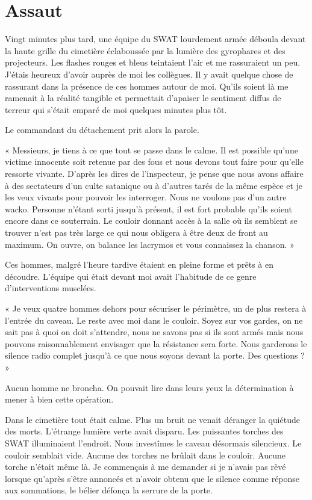 \chapter[Assaut]{Assaut}
Vingt minutes plus tard, une équipe du SWAT lourdement armée déboula devant la haute grille du cimetière éclaboussée 
par la lumière des gyrophares et des projecteurs. Les flashes rouges et bleus teintaient l'air et me rassuraient un peu. 
J'étais heureux d'avoir auprès de moi les collègues. Il y avait quelque chose de rassurant dans la présence de ces hommes 
autour de moi. Qu'ils soient là me ramenait à la réalité tangible et permettait d'apaiser le sentiment diffus de terreur 
qui s'était emparé de moi quelques minutes plus tôt.

Le commandant du détachement prit alors la parole.

« Messieurs, je tiens à ce que tout se passe dans le calme. Il est possible qu'une victime innocente soit retenue par 
des fous et nous devons tout faire pour qu'elle ressorte vivante. D'après les dires de l'inspecteur, je pense que nous 
avons affaire à des sectateurs d'un culte satanique ou à d'autres tarés de la même espèce et je les veux vivants pour 
pouvoir les interroger. Nous ne voulons pas d'un autre wacko. Personne n'étant sorti jusqu'à présent, il est fort 
probable qu'ils soient encore dans ce souterrain. Le couloir donnant accès à la salle où ils semblent se trouver n'est 
pas très large ce qui nous obligera à être deux de front au maximum. On ouvre, on balance les lacrymos et vous connaissez 
la chanson. »  

Ces hommes, malgré l'heure tardive étaient en pleine forme et prêts à en découdre. L'équipe qui était devant moi avait 
l'habitude de ce genre d'interventions musclées.

« Je veux quatre hommes dehors pour sécuriser le périmètre, un de plus restera à l'entrée du caveau. Le reste avec moi 
dans le couloir. Soyez sur vos gardes, on ne sait pas à quoi on doit s'attendre, nous ne savons pas si ils sont armés 
mais nous pouvons raisonnablement envisager que la résistance sera forte. Nous garderons le silence radio complet 
jusqu'à ce que nous soyons devant la porte. Des questions ? »

Aucun homme ne broncha. On pouvait lire dans leurs yeux la détermination à mener à bien cette opération.

Dans le cimetière tout était calme. Plus un bruit ne venait déranger la quiétude des morts. L'étrange lumière verte 
avait disparu. Les puissantes torches des SWAT illuminaient l'endroit. Nous investîmes le caveau désormais silencieux. 
Le couloir semblait vide. Aucune des torches ne brûlait dans le couloir. Aucune torche n'était même là. Je commençais 
à me demander si je n'avais pas rêvé lorsque qu'après s'être annoncés et n'avoir obtenu que le silence comme réponse 
aux sommations, le bélier défonça la serrure de la porte.

